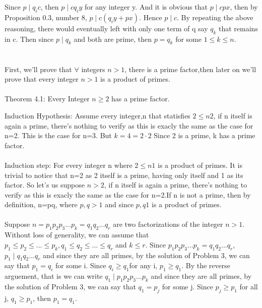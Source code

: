 \documentclass[a4paper,12pt]{article}
\begin{document}
Since $p \mid q_ic$, then $p \mid cq_iy$ for any integer y. And it is obvious that $p \mid cpx$, then by Proposition 0.3, number 8, $p \mid c(q_iy+px)$. Hence $p \mid c$. By repeating the above reasoning, there would eventually left with only one term of q say $q_k$ that remains in c. Then since $p \mid q_k$ and both are prime, then $p=q_k$ for some $1\leq k\leq n$.

\section{}
First, we'll prove that $\forall$ integers $n>1$, there is a prime factor,then later on we'll prove that every integer $n>1$ is a product of primes.

\paragraph{}
Theorem 4.1: Every Integer $n\geq 2$ has a prime factor.

Induction Hypothesis: Assume every integer,n that statisfies $2\leq n 2$, if n itself is again a prime, there's nothing to verify as this is exacly the same as the case for n=2. This is the case for n=3. But $k=4=2\cdot 2$ Since 2 is a prime, k has a prime factor.
\paragraph{}
Induction step: For every integer n where $2\leq n1$ is a product of primes.
It is trivial to notice that n=2 as 2 itself is a prime, having only itself and 1 as its factor. So let's us suppose $n>2$, if n itself is again a prime, there's nothing to verify as this is exacly the same as the case for n=2.If n is not a prime, then by definition, n=pq, where $p,q>1$ and since $p,q1$ is a product of primes.
\paragraph{}
Suppose $n=p_1p_2p_3...p_k=q_1q_2...q_r$ are two factorizations of the integer $n>1$. Without loss of generality, we can assume that $p_1\leq p_2\leq ...\leq p_k, q_1\leq q_2\leq...\leq q_r$ and $k\leq r$. Since $p_1p_2p_3...p_k=q_1q_2...q_r$, $p_1\mid q_1q_2...q_r$ and since they are all primes, by the solution of Problem 3, we can say that $p_1=q_i$ for some i. Since $q_i\geq q_1$for any i, $p_1\geq q_1$. By the reverse arguement, that is we can write $q_1\mid p_1p_2p_3...p_k$ and since they are all primes, by the solution of Problem 3, we can say that $q_1=p_j$ for some j. Since $p_j\geq p_1$ for all j, $q_1\geq p_1$, then $p_1=q_1$.
\end{document}
